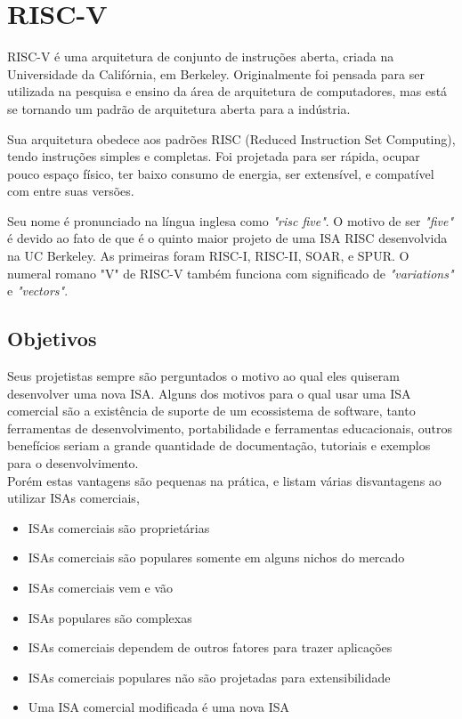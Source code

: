 
\section{RISC-V}%

	RISC-V é uma arquitetura de conjunto de instruções aberta, criada na Universidade da Califórnia, em Berkeley. Originalmente foi pensada para ser utilizada na pesquisa e ensino da área de arquitetura de computadores, mas está se tornando um padrão de arquitetura aberta para a indústria.~\cite{riscv_spec}

	Sua arquitetura obedece aos padrões RISC (Reduced Instruction Set Computing), tendo instruções simples e completas. Foi projetada para ser rápida, ocupar pouco espaço físico, ter baixo consumo de energia, ser extensível, e compatível com entre suas versões.

	Seu nome é pronunciado na língua inglesa como \textit{"risc five"}. O motivo de ser \textit{"five"} é devido ao fato de que é o quinto maior projeto de uma ISA RISC desenvolvida na UC Berkeley. As primeiras foram RISC-I, RISC-II, SOAR, e SPUR. O numeral romano "V" de RISC-V também funciona com significado de \textit{"variations"} e \textit{"vectors"}.

	\subsection{Objetivos}

		Seus projetistas sempre são perguntados o motivo ao qual eles quiseram desenvolver uma nova ISA. Alguns dos motivos para o qual usar uma ISA comercial são a existência de suporte de um ecossistema de software, tanto ferramentas de desenvolvimento, portabilidade e ferramentas educacionais, outros benefícios seriam a grande quantidade de documentação, tutoriais e exemplos para o desenvolvimento.\\

		Porém estas vantagens são pequenas na prática, e listam várias disvantagens ao utilizar ISAs comerciais,

		\begin{itemize}
			\item ISAs comerciais são proprietárias
			\item ISAs comerciais são populares somente em alguns nichos do mercado
			\item ISAs comerciais vem e vão
			\item ISAs populares são complexas
			\item ISAs comerciais dependem de outros fatores para trazer aplicações
			\item ISAs comerciais populares não são projetadas para extensibilidade
			\item Uma ISA comercial modificada é uma nova ISA
		\end{itemize}

